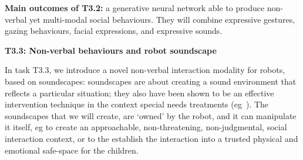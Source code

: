 %
%

\begin{framed}
    {\noindent\bf Main outcomes of T3.2:} a generative neural network able to produce
    non-verbal yet multi-modal social behaviours. They will combine expressive gestures, gazing
    behaviours, facial expressions, and expressive sounds.
\end{framed}


\textbf{T3.3: Non-verbal behaviours and robot soundscape}


In task T3.3, we introduce a novel non-verbal interaction modality for robots,
based on soundscapes: soundscapes are about creating a sound environment that
reflects a particular situation; they also have been shown to be an effective
intervention technique in the context special needs treatments
(eg~\cite{greher2010soundscape}). The soundscapes that we will create, are
`owned' by the robot, and it can manipulate it itself, eg to create an
approachable, non-threatening, non-judgmental, social interaction context, or to
the establish the interaction into a trusted physical and emotional safe-space
for the children.

